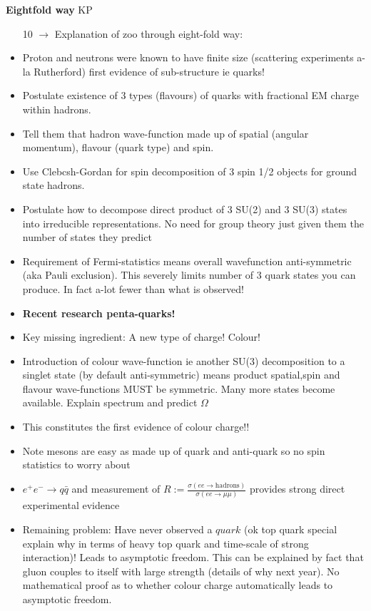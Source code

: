\begin{itemize}
{\bf Eightfold way} KP
\begin{itemize}
\item[10]$\to$ Explanation of zoo through eight-fold way:
\item Proton and neutrons were known to have finite size (scattering experiments a-la Rutherford) first evidence of sub-structure ie quarks!
\item Postulate existence of 3 types (flavours) of quarks with fractional EM charge within hadrons. 
\item Tell them that hadron wave-function made up of spatial (angular momentum), flavour (quark type) and spin. 
\item Use Clebcsh-Gordan for spin decomposition of 3 spin 1/2 objects for ground state hadrons.
\item Postulate how to decompose direct product of 3 SU(2) and 3 SU(3) states into irreducible representations. No need for group theory just given them the number of states they predict
\item Requirement of Fermi-statistics means overall wavefunction anti-symmetric (aka Pauli exclusion). This severely limits number of 3 quark states you can produce. In fact a-lot fewer than what is observed!
\item {\bf Recent research penta-quarks!}
\item Key missing ingredient: A new type of charge! Colour!
\item Introduction of colour wave-function ie another SU(3) decomposition to a singlet state (by default anti-symmetric) means product spatial,spin and flavour wave-functions MUST be symmetric. Many more states become available. Explain spectrum and predict $\Omega$
\item This constitutes the first evidence of colour charge!!
\item Note mesons are easy as made up of quark and anti-quark so no spin statistics to worry about
\item $e^+e^-\to q\bar{q}$ and measurement of $R:=\frac{\sigma(ee\to\mathrm{hadrons})}{\sigma(ee\to\mu\mu)}$ provides strong direct experimental evidence
\item Remaining problem: Have never observed a $quark$ (ok top quark special explain why in terms of heavy top quark and time-scale of strong interaction)! Leads to asymptotic freedom. This can be explained by fact that gluon couples to itself with large strength (details of why next year). No mathematical proof as to whether colour charge automatically leads to asymptotic freedom.

\end{itemize}
\end{itemize}
